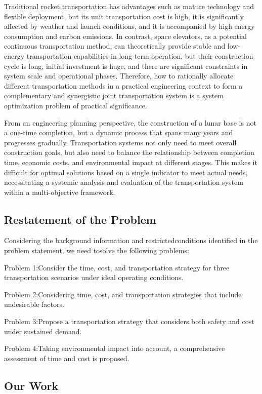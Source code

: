 \documentclass[12pt]{article}
\begin{document}
Traditional rocket transportation has advantages such as mature technology and flexible deployment, but its unit transportation cost is high, it is significantly affected by weather and launch conditions, and it is accompanied by high energy consumption and carbon emissions. In contrast, space elevators, as a potential continuous transportation method, can theoretically provide stable and low-energy transportation capabilities in long-term operation, but their construction cycle is long, initial investment is huge, and there are significant constraints in system scale and operational phases. Therefore, how to rationally allocate different transportation methods in a practical engineering context to form a complementary and synergistic joint transportation system is a system optimization problem of practical significance.

From an engineering planning perspective, the construction of a lunar base is not a one-time completion, but a dynamic process that spans many years and progresses gradually. Transportation systems not only need to meet overall construction goals, but also need to balance the relationship between completion time, economic costs, and environmental impact at different stages. This makes it difficult for optimal solutions based on a single indicator to meet actual needs, necessitating a systemic analysis and evaluation of the transportation system within a multi-objective framework.

\subsection{Restatement of the Problem}

Considering the background information and restrictedconditions identified in the problem statement, we need tosolve the following problems:

Problem 1:Consider the time, cost, and transportation strategy for three transportation scenarios under ideal operating conditions.

Problem 2:Considering time, cost, and transportation strategies that include undesirable factors.

Problem 3:Propose a transportation strategy that considers both safety and cost under sustained demand.

Problem 4:Taking environmental impact into account, a comprehensive assessment of time and cost is proposed.

\subsection{Our Work}
\end{document}

